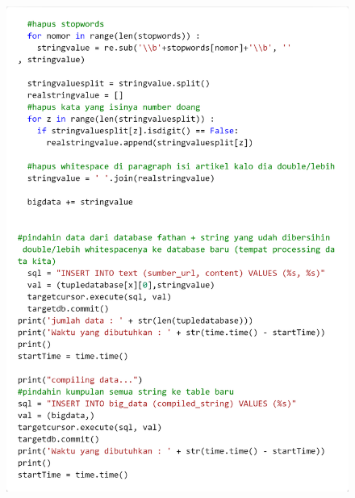 \documentclass[12pt]{report}
\begin{document}
\begin{figure}[H]
\centering
\includegraphics[scale=0.3]{onehotencode3}
\end{figure}
\end{document}
